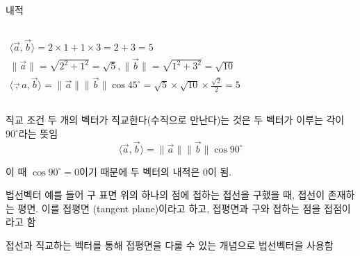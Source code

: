 \documentclass[10pt,t]{beamer}
\begin{document}
\begin{frame}{내적}
\begin{columns}

\begin{eqnarray*}
    \langle \vec{a}, \vec{b} \rangle = 2 \times 1 + 1\times 3 
    = 2 + 3 = 5    \\[1em]
    \| \vec{a} \| = \sqrt{2^2 + 1^2} = \sqrt{5}, \| \vec{b} \| = \sqrt{1^2 + 3^2} = \sqrt{10}\\ 
    \langle \vec,{a}, \vec{b} \rangle  = \|\vec{a}\| \|\vec{b} \| \cos 45^{\circ} = \sqrt{5} \times \sqrt{10} \times \frac{\sqrt{2}}{2} = 5
\end{eqnarray*}
\end{columns}
\end{frame}



\begin{frame}[fragile]{직교 조건}
    두 개의 벡터가 직교한다(수직으로 만난다)는 것은 두 벡터가 이루는 각이 $90^{\circ}$라는 뜻임
    \[ \langle \vec{a}, \vec{b} \rangle = \|\vec{a}\| \|\vec{b} \| \cos 90^{\circ} \]

    이 때 $\cos 90^{\circ}=0$이기 때문에 두 벡터의 내적은 0이 됨.
\end{frame}


\begin{frame}[fragile]{법선벡터}
    예를 들어 구 표면 위의 하나의 점에 접하는 접선을 구했을 때, 접선이 존재하는 평면. 이를 접평면 (tangent plane)이라고 하고, 접평면과 구와 접하는 점을 접점이라고 함

    접선과 직교하는 벡터를 통해 접평면을 다룰 수 있는 개념으로 법선벡터을 사용함
\end{frame}
\end{document}
